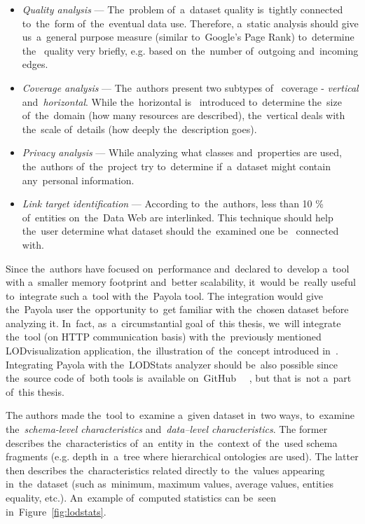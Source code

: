 \begin{itemize}
  \item \emph{Quality analysis} --- The~problem of~a~dataset quality is~tightly connected 
  to~the~form of~the~eventual data use. Therefore, a~static analysis should 
  give us~a~general purpose measure (similar to~Google's Page Rank) to~determine the~  quality very briefly, e.g. based on~the~number of~outgoing and~incoming 
  edges.
  
  \item \emph{Coverage analysis} --- The~authors present two subtypes of~  coverage - \emph{vertical} and~\emph{horizontal}.  While the~horizontal is~  introduced to~determine the~size of~the~domain (how many resources are described),
  the~vertical deals with the~scale of~details (how deeply the~description goes).
  
  \item \emph{Privacy analysis} --- While analyzing what classes and~properties 
  are used, the~authors of~the~project try to~determine if~a~dataset 
  might contain any~personal information.
  
  \item \emph{Link target identification} --- According to~the~authors, less than 
  10 \% of~entities on~the~Data Web are interlinked. This technique 
  should help the~user determine what dataset should the~examined one be~  connected with.
\end{itemize}

Since the~authors have focused on~performance and~declared to~develop a~tool with a~smaller memory footprint and~better scalability, it~would be~really useful to~integrate such a~tool with the~Payola tool.
The integration would give the~Payola user the~opportunity to~get familiar with the~chosen dataset before analyzing it. In~fact, as~a~circumstantial goal of~this 
thesis, we~will integrate the~tool (on HTTP communication basis) with the~previously mentioned 
LODvisualization application, the~illustration of~the~concept introduced 
in~\cite{ldvm}. Integrating Payola with the~LODStats analyzer should be~also 
possible since the~source code of~both tools is~available on~GitHub~\cite{github-payola} 
~\cite{github-lodstats}, but that is~not a~part of~this thesis.

The authors made the~tool to~examine a~given dataset in~two ways, to~examine 
the~\emph{schema-level characteristics} and~\emph{data--level characteristics}. 
The former describes the~characteristics of~an~entity in~the~context of~the~used 
schema fragments (e.g. depth in~a~tree where hierarchical ontologies are used). 
The latter then describes the~characteristics related directly to~the~values 
appearing in~the~dataset (such as~minimum, maximum values, average values, entities equality, 
etc.). An~example of~computed statistics can be~seen in~Figure~\ref{fig:lodstats}.

